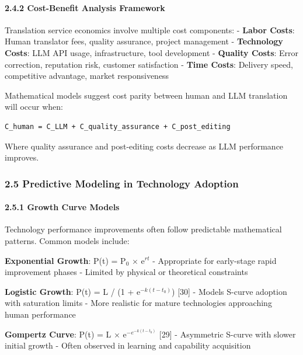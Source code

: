 \documentclass[12pt,a4paper]{article}
\begin{document}
{\hypertarget{cost-benefit-analysis-framework}{%
\paragraph{2.4.2 Cost-Benefit Analysis
Framework}\label{cost-benefit-analysis-framework}}

Translation service economics involve multiple cost components: -
\textbf{Labor Costs}: Human translator fees, quality assurance, project
management - \textbf{Technology Costs}: LLM API usage, infrastructure,
tool development - \textbf{Quality Costs}: Error correction, reputation
risk, customer satisfaction - \textbf{Time Costs}: Delivery speed,
competitive advantage, market responsiveness

Mathematical models suggest cost parity between human and LLM
translation will occur when:

\begin{verbatim}
C_human = C_LLM + C_quality_assurance + C_post_editing
\end{verbatim}

Where quality assurance and post-editing costs decrease as LLM
performance improves.

\hypertarget{predictive-modeling-in-technology-adoption}{%
\subsubsection{2.5 Predictive Modeling in Technology
Adoption}\label{predictive-modeling-in-technology-adoption}}

\hypertarget{growth-curve-models}{%
\paragraph{2.5.1 Growth Curve Models}\label{growth-curve-models}}

Technology performance improvements often follow predictable
mathematical patterns. Common models include:

\textbf{Exponential Growth}: P(t) = P$_0$ $\times$ e$^{rt}$ - Appropriate for
early-stage rapid improvement phases - Limited by physical or
theoretical constraints

\textbf{Logistic Growth}: P(t) = L / (1 + e$^{-k(t-t_0)}$) {[}30{]} -
Models S-curve adoption with saturation limits - More realistic for
mature technologies approaching human performance

\textbf{Gompertz Curve}: P(t) = L $\times$ e$^{-e^{-k(t-t_0)}}$
{[}29{]} - Asymmetric S-curve with slower initial growth - Often
observed in learning and capability acquisition

}
\end{document}
